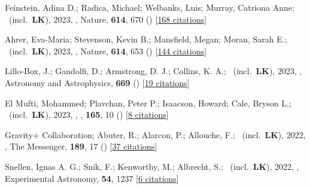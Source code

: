 \item[{\color{numcolor}\scriptsize81}] Feinstein, Adina D.; Radica, Michael; Welbanks, Luis; Murray, Catriona Anne; \etal\ (incl.\ \textbf{LK}), 2023, , Nature, \textbf{614}, 670 () [\href{https://ui.adsabs.harvard.edu/abs/2023Natur.614..670F}{168 citations}]

\item[{\color{numcolor}\scriptsize80}] Ahrer, Eva-Maria; Stevenson, Kevin B.; Mansfield, Megan; Moran, Sarah E.; \etal\ (incl.\ \textbf{LK}), 2023, , Nature, \textbf{614}, 653 () [\href{https://ui.adsabs.harvard.edu/abs/2023Natur.614..653A}{144 citations}]

\item[{\color{numcolor}\scriptsize79}] Lillo-Box, J.; Gandolfi, D.; Armstrong, D. J.; Collins, K. A.; \etal\ (incl.\ \textbf{LK}), 2023, , Astronomy and Astrophysics, \textbf{669} () [\href{https://ui.adsabs.harvard.edu/abs/2023A&A...669A.109L}{19 citations}]

\item[{\color{numcolor}\scriptsize78}] El Mufti, Mohammed; Plavchan, Peter P.; Isaacson, Howard; Cale, Bryson L.; \etal\ (incl.\ \textbf{LK}), 2023, , \aj, \textbf{165}, 10 () [\href{https://ui.adsabs.harvard.edu/abs/2023AJ....165...10E}{8 citations}]

\item[{\color{numcolor}\scriptsize77}] Gravity+ Collaboration; Abuter, R.; Alarcon, P.; Allouche, F.; \etal\ (incl.\ \textbf{LK}), 2022, , The Messenger, \textbf{189}, 17 () [\href{https://ui.adsabs.harvard.edu/abs/2022Msngr.189...17A}{37 citations}]

\item[{\color{numcolor}\scriptsize76}] Snellen, Ignas A. G.; Snik, F.; Kenworthy, M.; Albrecht, S.; \etal\ (incl.\ \textbf{LK}), 2022, , Experimental Astronomy, \textbf{54}, 1237 [\href{https://ui.adsabs.harvard.edu/abs/2022ExA....54.1237S}{6 citations}]

